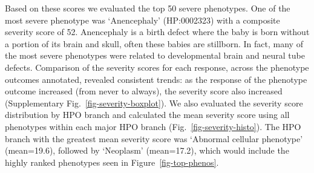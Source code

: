 \documentclass[
]{agujournal2019}
\begin{document}
Based on these scores we evaluated the top 50 severe phenotypes. One of
the most severe phenotype was `Anencephaly' (HP:0002323) with a
composite severity score of 52. Anencephaly is a birth defect where the
baby is born without a portion of its brain and skull, often these
babies are stillborn. In fact, many of the most severe phenotypes were
related to developmental brain and neural tube defects. Comparison of
the severity scores for each response, across the phenotype outcomes
annotated, revealed consistent trends: as the response of the phenotype
outcome increased (from never to always), the severity score also
increased (Supplementary Fig.~\ref{fig-severity-boxplot}). We also
evaluated the severity score distribution by HPO branch and calculated
the mean severity score using all phenotypes within each major HPO
branch (Fig.~\ref{fig-severity-histo}). The HPO branch with the greatest
mean severity score was `Abnormal cellular phenotype' (mean=19.6),
followed by `Neoplasm' (mean=17.2), which would include the highly
ranked phenotypes seen in Figure~\ref{fig-top-phenos}.
\end{document}
